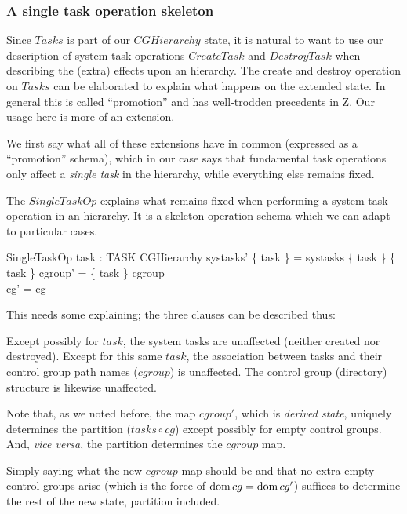 \documentclass[a4paper,twoside,12pt]{article}
\begin{document}
\subsubsection{A single task operation skeleton}

Since $Tasks$ is part of our $CGHierarchy$ state, it is natural to want to use our description of system task operations $CreateTask$ 
and $DestroyTask$ when describing the (extra) effects upon an hierarchy. The create and destroy operation on
$Tasks$ can be elaborated to explain what happens on the extended state. 
In general this is called ``promotion'' and has well-trodden precedents in Z. Our usage here is more of an extension.

We first say what all of these extensions have in common (expressed as a ``promotion'' schema), 
which in our case says that fundamental task operations only affect a \emph{single task} in the hierarchy, while 
everything else remains fixed.

The $SingleTaskOp$ explains what remains fixed when performing a system task operation in an hierarchy. 
It is a skeleton operation schema which we can adapt to particular cases.

\begin{schema}{SingleTaskOp}
task : TASK
\also
\Delta CGHierarchy
\where
systasks' \setminus \{ task \} = systasks \setminus \{ task \}
\also
\{ task \} \ndres cgroup' = \{ task \} \ndres cgroup \\
\dom cg' = \dom cg
\end{schema}
This needs some explaining; the three clauses can be described thus:

Except possibly for $task$, the system tasks are unaffected (neither created nor destroyed).
Except for this same $task$, the association between tasks and their control group path names ($cgroup$) is unaffected.
The control group (directory) structure is likewise unaffected.

Note that, as we noted before, the map $cgroup'$, which is \emph{derived state}, 
uniquely determines the partition ($tasks \circ cg$) except possibly for
empty control groups. And, \emph{vice versa}, the partition determines the $cgroup$ map. 

Simply saying what the new $cgroup$ map should be and that no extra empty control groups arise 
(which is the force of $\mathop{\mathrm{dom}} cg = \mathop{\mathrm{dom}} cg'$) 
suffices to determine the rest of the new state, partition included.
\end{document}
